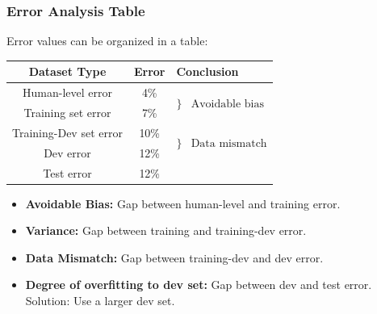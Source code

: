 \documentclass[letterpaper,12pt,notitlepage,twoside]{report}
\begin{document}
\subsubsection*{Error Analysis Table}
Error values can be organized in a table:
\begin{center}
    \renewcommand{\arraystretch}{2.0} %
    \begin{tabular}{@{}c c l@{}}
        \toprule
        \textbf{Dataset Type} & \textbf{Error} & \textbf{Conclusion} \\
        \midrule
        Human-level error & 4\% & \multirow{2}{*}{$\bigg\}\begin{array}{l}
        \end{array} \text{Avoidable bias}$} \\
        Training set error & 7\% & \multirow{2}{*}{$\bigg\}\begin{array}{l}
        \end{array} \text{Variance}$} \\
        Training-Dev set error & 10\% & \multirow{2}{*}{$\bigg\}\begin{array}{l}
        \end{array} \text{Data mismatch}$} \\
        Dev error & 12\% & \multirow{2}{*}{$\bigg\}\begin{array}{l}
        \end{array} \text{Overfitting to Dev set}$} \\
        Test error & 12\% & \\
        \bottomrule
    \end{tabular}
\end{center}

\begin{itemize}[nosep]
    \item \textbf{Avoidable Bias:} Gap between human-level and training error.
    \item \textbf{Variance:} Gap between training and training-dev error.
    \item \textbf{Data Mismatch:} Gap between training-dev and dev error.
    \item \textbf{Degree of overfitting to dev set:} Gap between dev and test error. Solution: Use a larger dev set.
\end{itemize}

\end{document}
